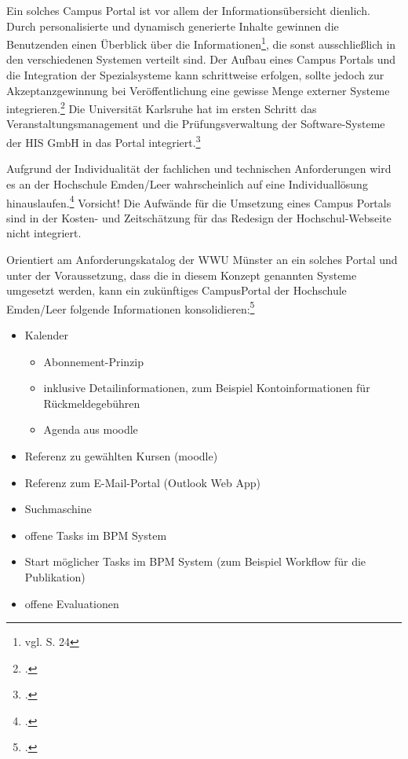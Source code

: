 {{Ein solches Campus Portal ist vor allem der Informationsübersicht dienlich. Durch personalisierte und dynamisch generierte Inhalte gewinnen die Benutzenden einen Überblick über die Informationen\footnote{vgl. \cite{dini_webportale_2007} S. 24}, die sonst ausschließlich in den verschiedenen Systemen verteilt sind. Der Aufbau eines Campus Portals und die Integration der Spezialsysteme kann schrittweise erfolgen, sollte jedoch zur Akzeptanzgewinnung bei Veröffentlichung eine gewisse Menge externer Systeme integrieren.\footcite[Vgl.][17 f.]{dini_webportale_2007} Die Universität Karlsruhe hat im ersten Schritt das Veranstaltungsmanagement und die Prüfungsverwaltung der Software-Systeme der HIS GmbH in das Portal integriert.\footcite[Vgl.][40 f.]{dini_webportale_2007}

Aufgrund der Individualität der fachlichen und technischen Anforderungen wird es an der Hochschule Emden/Leer wahrscheinlich auf eine Individuallösung hinauslaufen.\footcite[Vgl.][21]{dini_webportale_2007} Vorsicht! Die Aufwände für die Umsetzung eines Campus Portals sind in der Kosten- und Zeitschätzung für das Redesign der Hochschul-Webseite nicht integriert.

Orientiert am Anforderungskatalog der WWU Münster an ein solches Portal und unter der Voraussetzung, dass die in diesem Konzept genannten Systeme umgesetzt werden, kann ein zukünftiges CampusPortal der Hochschule Emden/Leer folgende Informationen konsolidieren:\footcite[Vgl.][158 ff.]{vogl_fortschritte_2012}

\begin{itemize}
	\item Kalender
	\begin{itemize}
		\item Abonnement-Prinzip
		\item inklusive Detailinformationen, zum Beispiel Kontoinformationen für Rückmeldegebühren
		\item Agenda aus moodle
	\end{itemize}
	\item Referenz zu gewählten Kursen (moodle)
	\item Referenz zum E-Mail-Portal (Outlook Web App)
	\item Suchmaschine
	\item offene Tasks im BPM System
	\item Start möglicher Tasks im BPM System (zum Beispiel Workflow für die Publikation)
	\item offene Evaluationen
\end{itemize}

}}
